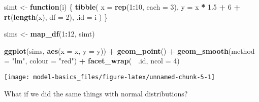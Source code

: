 \documentclass[]{book}
\newenvironment{Shaded}{\begin{snugshade}}{\end{snugshade}}
\newcommand{\ControlFlowTok}[1]{\textcolor[rgb]{0.13,0.29,0.53}{\textbf{#1}}}
\newcommand{\DataTypeTok}[1]{\textcolor[rgb]{0.13,0.29,0.53}{#1}}
\newcommand{\DecValTok}[1]{\textcolor[rgb]{0.00,0.00,0.81}{#1}}
\newcommand{\FloatTok}[1]{\textcolor[rgb]{0.00,0.00,0.81}{#1}}
\newcommand{\KeywordTok}[1]{\textcolor[rgb]{0.13,0.29,0.53}{\textbf{#1}}}
\newcommand{\NormalTok}[1]{#1}
\newcommand{\OperatorTok}[1]{\textcolor[rgb]{0.81,0.36,0.00}{\textbf{#1}}}
\newcommand{\StringTok}[1]{\textcolor[rgb]{0.31,0.60,0.02}{#1}}
\theoremstyle{plain}
\theoremstyle{remark}
\theoremstyle{definition}
\theoremstyle{definition}
\theoremstyle{definition}
\theoremstyle{remark}
\begin{document}
\begin{Shaded}
\begin{Highlighting}[]
\NormalTok{simt <-}\StringTok{ }\ControlFlowTok{function}\NormalTok{(i) \{}
  \KeywordTok{tibble}\NormalTok{(}
    \DataTypeTok{x =} \KeywordTok{rep}\NormalTok{(}\DecValTok{1}\OperatorTok{:}\DecValTok{10}\NormalTok{, }\DataTypeTok{each =} \DecValTok{3}\NormalTok{),}
    \DataTypeTok{y =}\NormalTok{ x }\OperatorTok{*}\StringTok{ }\FloatTok{1.5} \OperatorTok{+}\StringTok{ }\DecValTok{6} \OperatorTok{+}\StringTok{ }\KeywordTok{rt}\NormalTok{(}\KeywordTok{length}\NormalTok{(x), }\DataTypeTok{df =} \DecValTok{2}\NormalTok{),}
    \DataTypeTok{.id =}\NormalTok{ i}
\NormalTok{  )}
\NormalTok{\}}

\NormalTok{sims <-}\StringTok{ }\KeywordTok{map_df}\NormalTok{(}\DecValTok{1}\OperatorTok{:}\DecValTok{12}\NormalTok{, simt)}

\KeywordTok{ggplot}\NormalTok{(sims, }\KeywordTok{aes}\NormalTok{(}\DataTypeTok{x =}\NormalTok{ x, }\DataTypeTok{y =}\NormalTok{ y)) }\OperatorTok{+}
\StringTok{  }\KeywordTok{geom_point}\NormalTok{() }\OperatorTok{+}
\StringTok{  }\KeywordTok{geom_smooth}\NormalTok{(}\DataTypeTok{method =} \StringTok{"lm"}\NormalTok{, }\DataTypeTok{colour =} \StringTok{"red"}\NormalTok{) }\OperatorTok{+}
\StringTok{  }\KeywordTok{facet_wrap}\NormalTok{(}\OperatorTok{~}\StringTok{ }\NormalTok{.id, }\DataTypeTok{ncol =} \DecValTok{4}\NormalTok{)}
\end{Highlighting}
\end{Shaded}

\begin{center}\texttt{[image: model-basics\_files/figure-latex/unnamed-chunk-5-1]} \end{center}

What if we did the same things with normal distributions?
\end{document}
